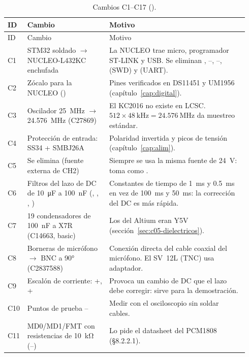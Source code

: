 {\footnotesize
\begin{longtable}{@{}L{0.05\linewidth}L{0.33\linewidth}L{0.56\linewidth}@{}}
\caption{Cambios C1--C17 ().}\label{tab:c05-cambios}\\
\toprule
ID & Cambio & Motivo\\\midrule\endfirsthead
\toprule ID & Cambio & Motivo\\\midrule\endhead
\bottomrule\endlastfoot
C1 & STM32 soldado $\to$ NUCLEO-L432KC enchufada & La NUCLEO trae micro, programador ST-LINK y USB. Se eliminan , --, --,  (SWD) y  (UART).\\
C2 & Zócalo para la NUCLEO () & Pines verificados en DS11451 y UM1956 (capítulo~\ref{cap:digital}).\\
C3 & Oscilador \SI{25}{\mega\hertz} $\to$ \SI{24.576}{\mega\hertz} (C27869) & El KC2016 no existe en LCSC. $512\times\SI{48}{\kilo\hertz}=\SI{24.576}{\mega\hertz}$ da muestreo estándar.\\
C4 & Protección de entrada:  SS34 +  SMBJ26A & Polaridad invertida y picos de tensión (capítulo~\ref{cap:alim}).\\
C5 & Se elimina  (fuente externa de CH2) & Siempre se usa la misma fuente de \SI{24}{\volt}:  toma  como .\\
C6 & Filtros del lazo de DC de \SI{10}{\micro\farad} a \SI{100}{\nano\farad} (, , , ) & Constantes de tiempo de \SI{1}{\milli\second} y \SI{0.5}{\milli\second} en vez de \SI{100}{\milli\second} y \SI{50}{\milli\second}: la corrección del DC es más rápida.\\
C7 & 19 condensadores de \SI{100}{\nano\farad} a X7R (C14663, basic) & Los del Altium eran Y5V (sección~\ref{sec:c05-dielectricos}).\\
C8 & Borneras de micrófono $\to$ BNC a \ang{90} (C2837588) & Conexión directa del cable coaxial del micrófono. El SV~12L (TNC) usa adaptador.\\
C9 & Escalón de corriente: +, + & Provoca un cambio de DC que el lazo debe corregir: sirve para la demostración.\\
C10 & Puntos de prueba -- & Medir con el osciloscopio sin soldar cables.\\
C11 & MD0/MD1/FMT con resistencias de \SI{10}{\kilo\ohm} (--) & Lo pide el datasheet del PCM1808 (§8.2.2.1).\\

\end{longtable}}
